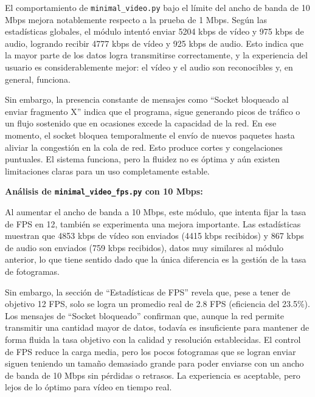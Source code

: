 El comportamiento de \texttt{minimal\_video.py} bajo el límite del ancho de banda de 10 Mbps mejora notablemente respecto a la prueba de 1 Mbps. Según las estadísticas globales, el módulo intentó enviar 5204 kbps de vídeo y 975 kbps de audio, logrando recibir 4777 kbps de vídeo y 925 kbps de audio. Esto indica que la mayor parte de los datos logra transmitirse correctamente, y la experiencia del usuario es considerablemente mejor: el vídeo y el audio son reconocibles y, en general, funciona.
\vspace{\baselineskip}

Sin embargo, la presencia constante de mensajes como ``Socket bloqueado al enviar fragmento X'' indica que el programa, sigue generando picos de tráfico o un flujo sostenido que en ocasiones excede la capacidad de la red. En ese momento, el socket bloquea temporalmente el envío de nuevos paquetes hasta aliviar la congestión en la cola de red. Esto produce cortes y congelaciones puntuales. El sistema funciona, pero la fluidez no es óptima y aún existen limitaciones claras para un uso completamente estable.

\vspace{\baselineskip}

\textbf{Análisis de \texttt{minimal\_video\_fps.py} con 10 Mbps:}
\vspace{\baselineskip}

Al aumentar el ancho de banda a 10 Mbps, este módulo, que intenta fijar la tasa de FPS en 12, también se experimenta una mejora importante. Las estadísticas muestran que 4853 kbps de vídeo son enviados (4415 kbps recibidos) y 867 kbps de audio son enviados (759 kbps recibidos), datos muy similares al módulo anterior, lo que tiene sentido dado que la única diferencia es la gestión de la tasa de fotogramas.
\vspace{\baselineskip}

Sin embargo, la sección de ``Estadísticas de FPS'' revela que, pese a tener de objetivo 12 FPS, solo se logra un promedio real de 2.8 FPS (eficiencia del 23.5\%). Los mensajes de ``Socket bloqueado'' confirman que, aunque la red permite transmitir una cantidad mayor de datos, todavía es insuficiente para mantener de forma fluida la tasa objetivo con la calidad y resolución establecidas. El control de FPS reduce la carga media, pero los pocos fotogramas que se logran enviar siguen teniendo un tamaño demasiado grande para poder enviarse con un ancho de banda de 10 Mbps sin pérdidas o retrasos. La experiencia es aceptable, pero lejos de lo óptimo para vídeo en tiempo real.

